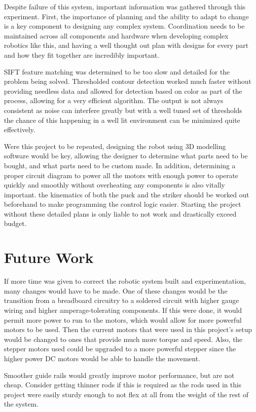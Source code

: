 \documentclass[letterpaper, 12 pt, conference]{ieeeconf}
\begin{document}
Despite failure of this system, important information was gathered through this experiment. First, the importance of planning and the ability to adapt to change is a key component to designing any complex system. Coordination needs to be maintained across all components and hardware when developing complex robotics like this, and having a well thought out plan with designs for every part and how they fit together are incredibly important. 

SIFT feature matching was determined to be too slow and detailed for the problem being solved. Thresholded contour detection worked much faster without providing needless data and allowed for detection based on color as part of the process, allowing for a very efficient algorithm. The output is not always consistent as noise can interfere greatly but with a well tuned set of thresholds the chance of this happening in a well lit environment can be minimized quite effectively.

Were this project to be repeated, designing the robot using 3D modelling software would be key, allowing the designer to determine what parts need to be bought, and what parts need to be custom made. In addition, determining a proper circuit diagram to power all the motors with enough power to operate quickly and smoothly without overheating any components is also vitally important. the kinematics of both the puck and the striker should be worked out beforehand to make programming the control logic easier. Starting the project without these detailed plans is only liable to not work and drastically exceed budget.

\section{Future Work}
\label{futurework}
If more time was given to correct the robotic system built and experimentation, many changes would have to be made.  One of these changes would be the transition from a breadboard circuitry to a soldered circuit with higher gauge wiring and higher amperage-tolerating components. If this were done, it would permit more power to run to the motors, which would allow for more powerful motors to be used. Then the current motors that were used in this project’s setup would be changed to ones that provide much more torque and speed.  Also, the stepper motors used could be upgraded to a more powerful stepper since the higher power DC motors would be able to handle the movement.

Smoother guide rails would greatly improve motor performance, but are not cheap. Consider getting thinner rods if this is required as the rods used in this project were easily sturdy enough to not flex at all from the weight of the rest of the system.
\end{document}
